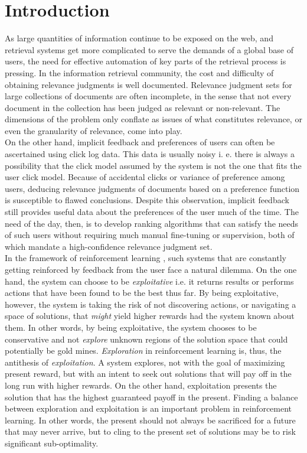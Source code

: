 \documentclass{acm_proc_article-sp}
\begin{document}
\section{Introduction}
As large quantities of information continue to be exposed on the web, and retrieval systems get more complicated to serve the demands of a global base of users, the need for effective automation of key parts of the retrieval process is pressing. In the information retrieval community, the cost and difficulty of obtaining relevance judgments is well documented. Relevance judgment sets for large collections of documents are often incomplete, in the sense that not every document in the collection has been judged as relevant or non-relevant. The dimensions of the problem only conflate as issues of what constitutes relevance, or even the granularity of relevance, come into play. \\
On the other hand, implicit feedback and preferences of users can often be ascertained using click log data. This data is usually noisy i. e. there is always a possibility that the click model assumed by the system is not the one that fits the user click model. Because of accidental clicks or variance of preference among users, deducing relevance judgments of documents based on a preference function is susceptible to flawed conclusions. Despite this observation, implicit feedback still provides useful data about the preferences of the user much of the time. The need of the day, then, is to develop ranking algorithms that can satisfy the needs of such users without requiring much manual fine-tuning or supervision, both of which mandate a high-confidence relevance judgment set. \\
In the framework of reinforcement learning \cite{rl}, such systems that are constantly getting reinforced by feedback from the user face a natural dilemma. On the one hand, the system can choose to be \emph{exploitative} i.e. it returns results or performs actions that have been found to be the best thus far. By being exploitative, however, the system is taking the risk of not discovering actions, or navigating a space of solutions, that \emph{might} yield higher rewards had the system known about them. In other words, by being exploitative, the system chooses to be conservative and not \emph{explore} unknown regions of the solution space that could potentially be gold mines. \emph{Exploration} in reinforcement learning is, thus, the antithesis of \emph{exploitation}. A system explores, not with the goal of maximizing present reward, but with an intent to seek out solutions that will pay off in the long run with higher rewards. On the other hand, exploitation presents the solution that has the highest guaranteed payoff in the present. Finding a balance between exploration and exploitation is an important problem in reinforcement learning. In other words, the present should not always be sacrificed for a future that may never arrive, but to cling to the present set of solutions may be to risk significant sub-optimality.\\
\end{document}
